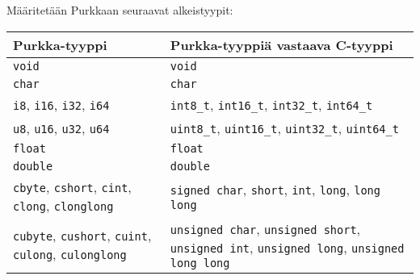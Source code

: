 Määritetään Purkkaan seuraavat alkeistyypit: \\[0.3cm]
\begin{tabular}{@{}p{5.8cm}p{8.7cm}@{}} \toprule
    Purkka-tyyppi & Purkka-tyyppiä vastaava C-tyyppi \\ \midrule
    \texttt{void} & \texttt{void} \\
    \texttt{char} & \texttt{char} \\
    \texttt{i8}, \texttt{i16}, \texttt{i32}, \texttt{i64} &
    \texttt{int8\_t}, \texttt{int16\_t}, \texttt{int32\_t}, \texttt{int64\_t} \\
    \texttt{u8}, \texttt{u16}, \texttt{u32}, \texttt{u64} &
    \texttt{uint8\_t}, \texttt{uint16\_t}, \texttt{uint32\_t}, \texttt{uint64\_t} \\
    \texttt{float} & \texttt{float} \\
    \texttt{double} & \texttt{double} \\
    [0.3cm]

    \texttt{cbyte}, \texttt{cshort}, \texttt{cint}, \texttt{clong}, \texttt{clonglong}
    & \texttt{signed char}, \texttt{short}, \texttt{int}, \texttt{long}, \texttt{long long} \\
    \noalign{\vspace{0.3cm}}

    \texttt{cubyte}, \texttt{cushort}, \texttt{cuint}, \texttt{culong}, \texttt{culonglong}
    & \texttt{unsigned char}, \texttt{unsigned short}, \texttt{unsigned int},
      \texttt{unsigned long}, \texttt{unsigned long long} \\
    \bottomrule
\end{tabular} \\

